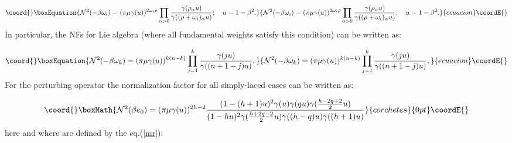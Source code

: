 \documentclass[a4paper,12pt]{article}
\begin{document}
\begin{equation}\coord{}\boxEquation{
{\cal N}^2(-\beta \omega _i)=(\pi \mu \gamma (u))^{2\omega _i\rho
}\prod_{\alpha >0}\frac{\gamma (\rho _\alpha u)}{\gamma ((\rho +\omega
_i)_\alpha u)};\quad u=1-\beta ^2.  \label{gd}
}{
{\cal N}^2(-\beta \omega _i)=(\pi \mu \gamma (u))^{2\omega _i\rho
}\prod_{\alpha >0}\frac{\gamma (\rho _\alpha u)}{\gamma ((\rho +\omega
_i)_\alpha u)};\quad u=1-\beta ^2.  }{ecuacion}\coordE{}\end{equation}
In particular, the NFs \coordHE{} for Lie algebra \coordHE{}
(where all fundamental weights satisfy this condition) can be written as:

\begin{equation}\coord{}\boxEquation{
{\cal N}^2(-\beta \omega _k)=(\pi \mu \gamma (u))^{k(n-k)}\prod_{j=1}^k\frac{
\gamma (ju)}{\gamma ((n+1-j)u)},  \label{an}
}{
{\cal N}^2(-\beta \omega _k)=(\pi \mu \gamma (u))^{k(n-k)}\prod_{j=1}^k\frac{
\gamma (ju)}{\gamma ((n+1-j)u)},  }{ecuacion}\coordE{}\end{equation}
For the perturbing operator \coordHE{} the normalization factor for all simply-laced cases can be written
as:

\begin{displaymath}\coord{}\boxMath{
{\cal N}^2(\beta e_0)=(\pi \mu \gamma (u))^{2h-2}\frac{(1-(h+1)u)^2\gamma
(u)\gamma (qu)\gamma (\frac{h-2q+2}2u)}{(1-hu)^2\gamma (\frac{h+2q-2}{2}u)
\gamma ((h-q)u)\gamma ((h+1)u)}  
}{corchetes}{0pt}\coordE{}\end{displaymath}
here \coordHE{} and \coordHE{} where \coordHE{} are defined by
the eq.(\ref{mr}): \coordHE{}
\end{document}
